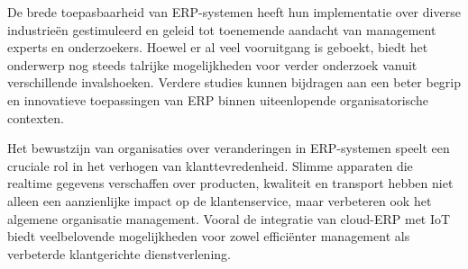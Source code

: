 De brede toepasbaarheid van ERP-systemen heeft hun implementatie over diverse industrieën gestimuleerd en geleid tot toenemende aandacht van management experts en onderzoekers. Hoewel er al veel vooruitgang is geboekt, biedt het onderwerp nog steeds talrijke mogelijkheden voor verder onderzoek vanuit verschillende invalshoeken. Verdere studies kunnen bijdragen aan een beter begrip en innovatieve toepassingen van ERP binnen uiteenlopende organisatorische contexten. \autocite{sheik2020enterprise}

\vspace{\baselineskip}






Het bewustzijn van organisaties over veranderingen in ERP-systemen speelt een cruciale rol in het verhogen van klanttevredenheid. Slimme apparaten die realtime gegevens verschaffen over producten, kwaliteit en transport hebben niet alleen een aanzienlijke impact op de klantenservice, maar verbeteren ook het algemene organisatie management. Vooral de integratie van cloud-ERP met IoT biedt veelbelovende mogelijkheden voor zowel efficiënter management als verbeterde klantgerichte dienstverlening. \autocite{tavana2020iot}

